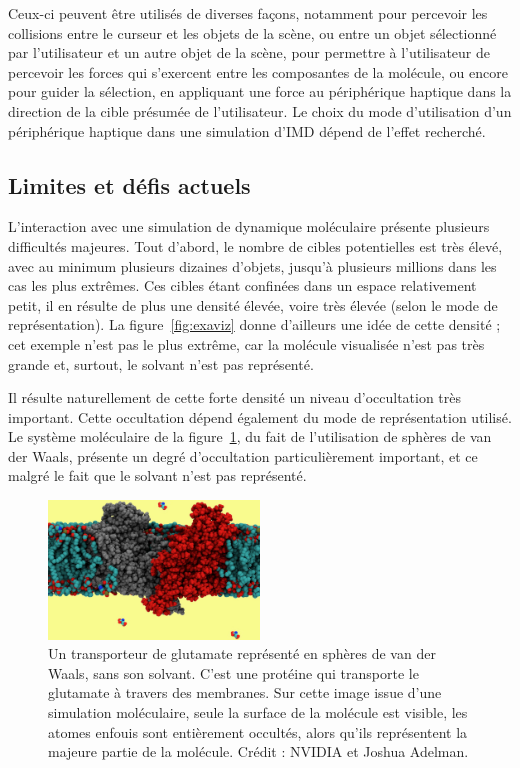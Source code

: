 	Ceux-ci peuvent être utilisés de diverses façons, notamment pour percevoir les \og collisions \fg{} entre le curseur et les objets de la scène, ou entre un objet sélectionné par l'utilisateur et un autre objet de la scène, pour permettre à l'utilisateur de percevoir les forces qui s'exercent entre les composantes de la molécule, ou encore pour guider la sélection, en appliquant une force au périphérique haptique dans la direction de la cible présumée de l'utilisateur. Le choix du mode d'utilisation d'un périphérique haptique dans une simulation d'IMD dépend de l'effet recherché.
	
	\subsection{Limites et défis actuels}
	L'interaction avec une simulation de dynamique moléculaire présente plusieurs difficultés majeures. Tout d'abord, le nombre de cibles potentielles est très élevé, avec au minimum plusieurs dizaines d'objets, jusqu'à plusieurs millions dans les cas les plus extrêmes. Ces cibles étant confinées dans un espace relativement petit, il en résulte de plus une densité élevée, voire très élevée (selon le mode de représentation). La figure~\ref{fig:exaviz} donne d'ailleurs une idée de cette densité ; cet exemple n'est pas le plus extrême, car la molécule visualisée n'est pas très grande et, surtout, le solvant n'est pas représenté.
	
	Il résulte naturellement de cette forte densité un niveau d'occultation très important. Cette occultation dépend également du mode de représentation utilisé. Le système moléculaire de la figure~\ref{fig:gluTrans}, du fait de l'utilisation de sphères de van der Waals, présente un degré d'occultation particulièrement important, et ce malgré le fait que le solvant n'est pas représenté.
	
	\begin{figure}%
		\centering
		\includegraphics[width=0.5\textwidth]{figures/ch1/gluTrans}
		\caption[Transporteur de glutamate, très forte occultation]{Un transporteur de glutamate représenté en sphères de van der Waals, sans son solvant. C'est une protéine qui transporte le glutamate à travers des membranes. Sur cette image issue d'une simulation moléculaire, seule la surface de la molécule est visible, les atomes \og enfouis \fg{} sont entièrement occultés, alors qu'ils représentent la majeure partie de la molécule. Crédit : NVIDIA et Joshua Adelman\footnotemark.}
		\label{fig:gluTrans}
	\end{figure}
	
